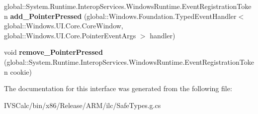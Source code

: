 \begin{DoxyCompactItemize}
global\+::\+System.\+Runtime.\+Interop\+Services.\+Windows\+Runtime.\+Event\+Registration\+Token {\bfseries add\+\_\+\+Pointer\+Pressed} (global\+::\+Windows.\+Foundation.\+Typed\+Event\+Handler$<$ global\+::\+Windows.\+U\+I.\+Core.\+Core\+Window, global\+::\+Windows.\+U\+I.\+Core.\+Pointer\+Event\+Args $>$ handler)
\item 
\mbox{\label{interface_windows_1_1_u_i_1_1_core_1_1_i_core_window_a424e6380efab58ea6d5ecf929352533e}} 
void {\bfseries remove\+\_\+\+Pointer\+Pressed} (global\+::\+System.\+Runtime.\+Interop\+Services.\+Windows\+Runtime.\+Event\+Registration\+Token cookie)
\end{DoxyCompactItemize}


The documentation for this interface was generated from the following file\+:\begin{DoxyCompactItemize}
\item 
I\+V\+S\+Calc/bin/x86/\+Release/\+A\+R\+M/ilc/Safe\+Types.\+g.\+cs\end{DoxyCompactItemize}
